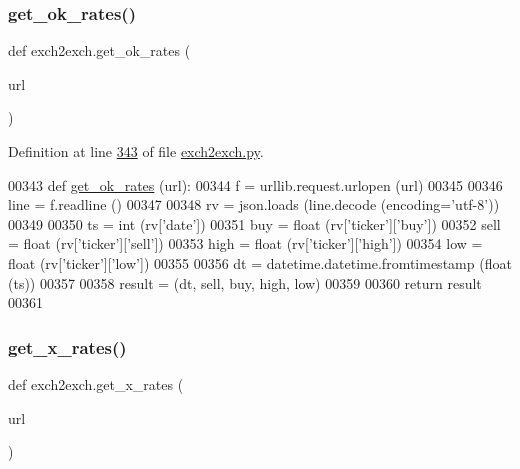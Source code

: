 \subsubsection{\texorpdfstring{get\+\_\+ok\+\_\+rates()}{get\_ok\_rates()}}
{\footnotesize\ttfamily def exch2exch.\+get\+\_\+ok\+\_\+rates (\begin{DoxyParamCaption}\item[{}]{url }\end{DoxyParamCaption})}



Definition at line \hyperlink{exch2exch_8py_source_l00343}{343} of file \hyperlink{exch2exch_8py_source}{exch2exch.\+py}.


\begin{DoxyCode}
00343 \textcolor{keyword}{def }\hyperlink{namespaceexch2exch_a157dc1519ab4a24783fab8bf7db9c17e}{get\_ok\_rates} (url):
00344     f = urllib.request.urlopen (url)
00345     
00346     line = f.readline ()
00347     
00348     rv = json.loads (line.decode (encoding=\textcolor{stringliteral}{'utf-8'}))
00349     
00350     ts   = int   (rv[\textcolor{stringliteral}{'date'}])
00351     buy  = float (rv[\textcolor{stringliteral}{'ticker'}][\textcolor{stringliteral}{'buy'}])
00352     sell = float (rv[\textcolor{stringliteral}{'ticker'}][\textcolor{stringliteral}{'sell'}])
00353     high = float (rv[\textcolor{stringliteral}{'ticker'}][\textcolor{stringliteral}{'high'}])
00354     low  = float (rv[\textcolor{stringliteral}{'ticker'}][\textcolor{stringliteral}{'low'}])
00355     
00356     dt = datetime.datetime.fromtimestamp (float (ts))
00357     
00358     result = (dt, sell, buy, high, low)
00359     
00360     \textcolor{keywordflow}{return} result
00361 
\end{DoxyCode}
\mbox{\label{namespaceexch2exch_a928a1249a810cfd0ec5fca3ec8f764fb}} 
\subsubsection{\texorpdfstring{get\+\_\+x\+\_\+rates()}{get\_x\_rates()}}
{\footnotesize\ttfamily def exch2exch.\+get\+\_\+x\+\_\+rates (\begin{DoxyParamCaption}\item[{}]{url }\end{DoxyParamCaption})}



